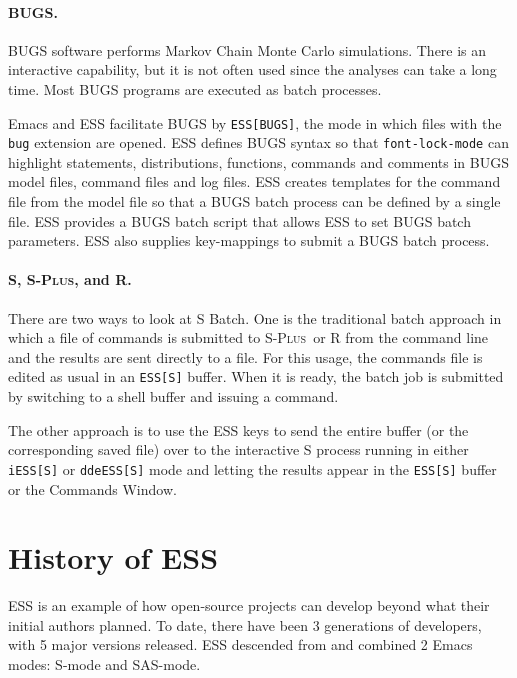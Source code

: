 \documentclass{article}
\newcommand*{\Splus}{\textsc{S-Plus}}
\newcommand{\stexttt}[1]{{\small\texttt{#1}}}
\begin{document}
\paragraph{BUGS.}
\label{sec:bugs-batch}
  
BUGS software performs Markov Chain Monte Carlo simulations.  There is
an interactive capability, but it is not often used since the analyses
can take a long time. %
Most BUGS programs are executed as batch processes.

Emacs and ESS facilitate BUGS by \stexttt{ESS[BUGS]}, the mode in which 
files with the \stexttt{bug} extension are opened.  ESS defines BUGS 
syntax so that
\stexttt{font-lock-mode} can highlight statements, distributions,
functions, commands and comments in BUGS model files, command files
and log files.  ESS creates templates for the command file from the
model file so that a BUGS batch process can be defined by a single
file.  ESS provides a BUGS batch script that allows ESS to set BUGS
batch parameters.  ESS also supplies key-mappings to submit a BUGS
batch process.

\paragraph{S, \Splus, and R.}
There are two ways to look at S Batch.  One is the traditional batch
approach in which a file of commands is submitted to \Splus\ or R from
the command line and the results are sent directly to a file.  For
this usage, the commands file is edited as usual in an \stexttt{ESS[S]}
buffer.  When it is ready, the batch job is submitted by switching to a
shell buffer and issuing a command.

The other approach is to use the ESS keys to send the entire buffer
(or the corresponding saved file) over to the interactive S process
running in either \stexttt{iESS[S]} or \stexttt{ddeESS[S]} mode and
letting the results appear in the \stexttt{ESS[S]} buffer or the
Commands Window.


\section{History of ESS}
\label{sec:ESS:history}

ESS is an example of how open-source projects can develop beyond what
their initial authors planned.  To date, there have been 3 generations
of developers, with 5 major versions released.  ESS descended from and combined
2 Emacs modes: S-mode and SAS-mode.
\end{document}
